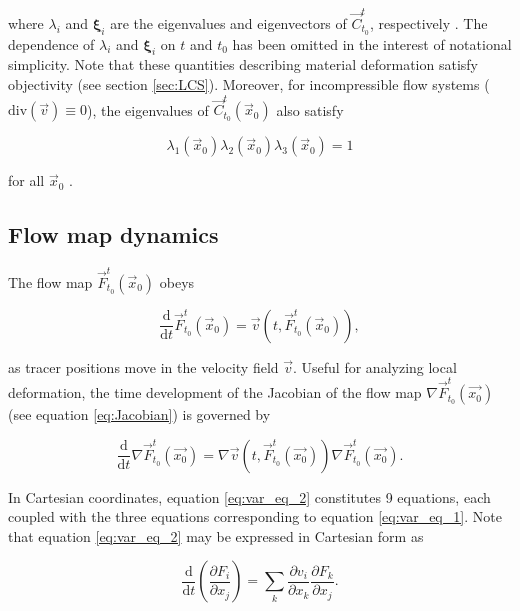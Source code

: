 \noindent where $\lambda_i$ and $\bm{\xi}_i$ are the eigenvalues and eigenvectors of $\vec{C}_{t_0}^{t}$, respectively \citep{Haller14}. The dependence of $\lambda_i$ and $\bm{\xi}_i$ on $t$ and $t_0$ has been omitted in the interest of notational simplicity. Note that these quantities describing material deformation satisfy objectivity (see section \ref{sec:LCS}). Moreover, for incompressible flow systems ($\text{div}(\vec{v})\equiv 0$), the eigenvalues of $\vec{C}_{t_0}^{t}(\vec{x}_0)$ also satisfy

\begin{equation}
	\lambda_1(\vec{x}_0)\lambda_2(\vec{x}_0)\lambda_3(\vec{x}_0) = 1
\end{equation}

\noindent for all $\vec{x}_0$ \citep{LCSreview}.

\subsection{Flow map dynamics}\label{sec:FlowMapDynamics}

The flow map $\vec{F}_{t_0}^{t}(\vec{x}_0)$ obeys

\begin{equation}\label{eq:var_eq_1}
\frac{\text{d}}{\text{d}t}\vec{F}_{t_0}^{t}(\vec{x}_0) = \vec{v}\left(t,\vec{F}_{t_0}^{t}(\vec{x}_0)\right),
\end{equation}

\noindent as tracer positions move in the velocity field $\vec{v}$. Useful for analyzing local deformation, the time development of the Jacobian of the flow map $\nabla \vec{F}_{t_0}^{t}(\vec{x_0})$ (see equation \eqref{eq:Jacobian}) is governed by \citep{VariationalEquations}

\begin{equation}\label{eq:var_eq_2}
\frac{\text{d}}{\text{d}t}\nabla \vec{F}_{t_0}^{t}(\vec{x_0}) = \nabla \vec{v}\left(t,\vec{F}_{t_0}^{t}(\vec{x_0})\right)\nabla \vec{F}_{t_0}^{t}(\vec{x_0}).
\end{equation}

\noindent In Cartesian coordinates, equation \eqref{eq:var_eq_2} constitutes 9 equations, each coupled with the three equations corresponding to equation \eqref{eq:var_eq_1}. Note that equation \eqref{eq:var_eq_2} may be expressed in Cartesian form as

\begin{equation}\label{eq:var_eq_2_cartesian}
\frac{\text{d}}{\text{d}t}\left(\frac{\partial F_i}{\partial x_j}\right) = \sum_k \frac{\partial v_i}{\partial x_k} \frac{\partial F_k}{\partial x_j}.
\end{equation}

